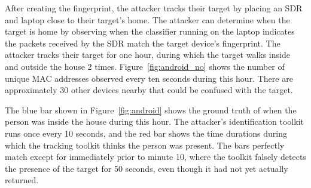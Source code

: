 After creating the fingerprint, the attacker tracks their target by placing an
SDR and laptop close to their target's home. The attacker can determine when the target is
home by observing when the classifier running on the laptop indicates the packets received by the SDR match the target device's fingerprint.
%
The attacker tracks their target for one hour, during which the target walks
inside and outside the house 2 times. Figure~\ref{fig:android_no} shows the
number of unique MAC addresses observed every ten seconds during this hour.
There are approximately 30 other devices nearby that could be confused with the target.


The blue bar shown in Figure~\ref{fig:android} shows the ground truth of when
the person was inside the house during this hour. The attacker's identification
toolkit runs once every 10 seconds, and the red bar shows the time durations
during which the tracking toolkit thinks the person was present. The bars
perfectly match except for immediately prior to minute 10, where the toolkit
falsely detects the presence of the target for 50 seconds, even though it had
not yet actually returned.


